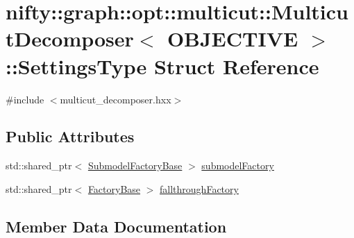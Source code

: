 \hypertarget{structnifty_1_1graph_1_1opt_1_1multicut_1_1MulticutDecomposer_1_1SettingsType}{}\section{nifty\+:\+:graph\+:\+:opt\+:\+:multicut\+:\+:Multicut\+Decomposer$<$ O\+B\+J\+E\+C\+T\+I\+VE $>$\+:\+:Settings\+Type Struct Reference}
\label{structnifty_1_1graph_1_1opt_1_1multicut_1_1MulticutDecomposer_1_1SettingsType}


{\ttfamily \#include $<$multicut\+\_\+decomposer.\+hxx$>$}

\subsection*{Public Attributes}
\begin{DoxyCompactItemize}
\item 
std\+::shared\+\_\+ptr$<$ \hyperlink{classnifty_1_1graph_1_1opt_1_1multicut_1_1MulticutDecomposer_a7b25dc946b8d2e57e76ab54bca655f63}{Submodel\+Factory\+Base} $>$ \hyperlink{structnifty_1_1graph_1_1opt_1_1multicut_1_1MulticutDecomposer_1_1SettingsType_a28b5c87651310fa67d1fb6b2f1b92649}{submodel\+Factory}
\item 
std\+::shared\+\_\+ptr$<$ \hyperlink{classnifty_1_1graph_1_1opt_1_1multicut_1_1MulticutDecomposer_a0fb13bd2e6a0c561ae55b31deab53639}{Factory\+Base} $>$ \hyperlink{structnifty_1_1graph_1_1opt_1_1multicut_1_1MulticutDecomposer_1_1SettingsType_a58492d9e665402110269aaed91318cab}{fallthrough\+Factory}
\end{DoxyCompactItemize}


\subsection{Member Data Documentation}
\mbox{\label{structnifty_1_1graph_1_1opt_1_1multicut_1_1MulticutDecomposer_1_1SettingsType_a58492d9e665402110269aaed91318cab}} 
